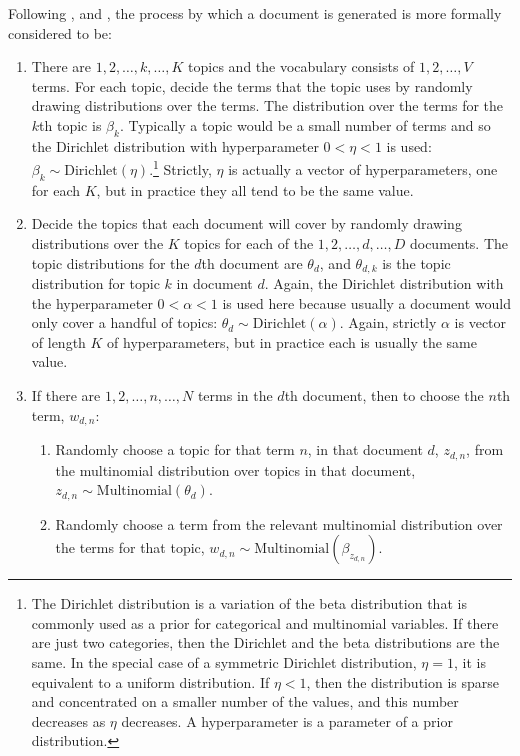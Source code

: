 \documentclass[12pt,]{article}
\providecommand{\tightlist}{%
\setlength{\itemsep}{0pt}\setlength{\parskip}{0pt}}
\theoremstyle{definition}
\theoremstyle{definition}
\theoremstyle{definition}
\theoremstyle{remark}
\begin{document}
Following \citet{BleiLafferty2009}, \citet{blei2012} and
\citet{GriffithsSteyvers2004}, the process by which a document is
generated is more formally considered to be:

\begin{enumerate}
\def\labelenumi{\arabic{enumi}.}
\tightlist
\item
  There are \(1, 2, \dots, k, \dots, K\) topics and the vocabulary
  consists of \(1, 2, \dots, V\) terms. For each topic, decide the terms
  that the topic uses by randomly drawing distributions over the terms.
  The distribution over the terms for the \(k\)th topic is \(\beta_k\).
  Typically a topic would be a small number of terms and so the
  Dirichlet distribution with hyperparameter \(0<\eta<1\) is used:
  \(\beta_k \sim \mbox{Dirichlet}(\eta)\).\footnote{The Dirichlet
    distribution is a variation of the beta distribution that is
    commonly used as a prior for categorical and multinomial variables.
    If there are just two categories, then the Dirichlet and the beta
    distributions are the same. In the special case of a symmetric
    Dirichlet distribution, \(\eta=1\), it is equivalent to a uniform
    distribution. If \(\eta<1\), then the distribution is sparse and
    concentrated on a smaller number of the values, and this number
    decreases as \(\eta\) decreases. A hyperparameter is a parameter of
    a prior distribution.} Strictly, \(\eta\) is actually a vector of
  hyperparameters, one for each \(K\), but in practice they all tend to
  be the same value.
\item
  Decide the topics that each document will cover by randomly drawing
  distributions over the \(K\) topics for each of the
  \(1, 2, \dots, d, \dots, D\) documents. The topic distributions for
  the \(d\)th document are \(\theta_d\), and \(\theta_{d,k}\) is the
  topic distribution for topic \(k\) in document \(d\). Again, the
  Dirichlet distribution with the hyperparameter \(0<\alpha<1\) is used
  here because usually a document would only cover a handful of topics:
  \(\theta_d \sim \mbox{Dirichlet}(\alpha)\). Again, strictly \(\alpha\)
  is vector of length \(K\) of hyperparameters, but in practice each is
  usually the same value.
\item
  If there are \(1, 2, \dots, n, \dots, N\) terms in the \(d\)th
  document, then to choose the \(n\)th term, \(w_{d, n}\):

  \begin{enumerate}
  \def\labelenumii{\alph{enumii}.}
  \tightlist
  \item
    Randomly choose a topic for that term \(n\), in that document \(d\),
    \(z_{d,n}\), from the multinomial distribution over topics in that
    document, \(z_{d,n} \sim \mbox{Multinomial}(\theta_d)\).
  \item
    Randomly choose a term from the relevant multinomial distribution
    over the terms for that topic,
    \(w_{d,n} \sim \mbox{Multinomial}(\beta_{z_{d,n}})\).
  \end{enumerate}
\end{enumerate}
\end{document}
